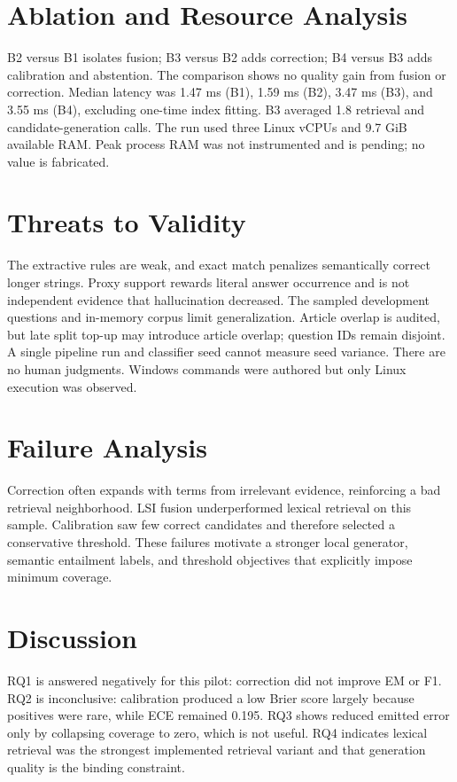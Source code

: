 \documentclass[conference]{IEEEtran}
\begin{document}
\section{Ablation and Resource Analysis}B2 versus B1 isolates fusion; B3 versus B2 adds correction; B4 versus B3 adds calibration and abstention. The comparison shows no quality gain from fusion or correction. Median latency was 1.47 ms (B1), 1.59 ms (B2), 3.47 ms (B3), and 3.55 ms (B4), excluding one-time index fitting. B3 averaged 1.8 retrieval and candidate-generation calls. The run used three Linux vCPUs and 9.7 GiB available RAM. Peak process RAM was not instrumented and is pending; no value is fabricated.
\section{Threats to Validity}The extractive rules are weak, and exact match penalizes semantically correct longer strings. Proxy support rewards literal answer occurrence and is not independent evidence that hallucination decreased. The sampled development questions and in-memory corpus limit generalization. Article overlap is audited, but late split top-up may introduce article overlap; question IDs remain disjoint. A single pipeline run and classifier seed cannot measure seed variance. There are no human judgments. Windows commands were authored but only Linux execution was observed.
\section{Failure Analysis}Correction often expands with terms from irrelevant evidence, reinforcing a bad retrieval neighborhood. LSI fusion underperformed lexical retrieval on this sample. Calibration saw few correct candidates and therefore selected a conservative threshold. These failures motivate a stronger local generator, semantic entailment labels, and threshold objectives that explicitly impose minimum coverage.
\clearpage
\section{Discussion}RQ1 is answered negatively for this pilot: correction did not improve EM or F1. RQ2 is inconclusive: calibration produced a low Brier score largely because positives were rare, while ECE remained 0.195. RQ3 shows reduced emitted error only by collapsing coverage to zero, which is not useful. RQ4 indicates lexical retrieval was the strongest implemented retrieval variant and that generation quality is the binding constraint.
\end{document}
